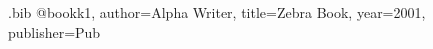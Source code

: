 \begin{filecontents*}[overwrite]{\jobname.bib}
@book{k1, author={Alpha Writer}, title={Zebra Book}, year={2001}, publisher={Pub}}
\end{filecontents*}
\documentclass{article}
\usepackage[style=authoryear]{biblatex}


Text \cite{k1}.
\printbibliography[title=Primary Sources Wombat, prenote=pn]

